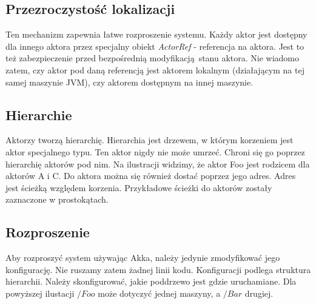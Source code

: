 \documentclass[oneside, 12pt, a4paper]{article}
\begin{document}
\begin{multicols}{2}
\subsection{Przezroczystość lokalizacji}
Ten mechanizm zapewnia łatwe rozproszenie systemu. Każdy aktor jest dostępny dla innego aktora przez specjalny obiekt \emph{ActorRef} - referencja na aktora. Jest to też zabezpieczenie przed bezpośrednią modyfikacją stanu aktora. Nie wiadomo zatem, czy aktor pod daną referencją jest aktorem lokalnym (działającym na tej samej maszynie JVM), czy aktorem dostępnym na innej maszynie.

\subsection{Hierarchie}
Aktorzy tworzą hierarchię. Hierarchia jest drzewem, w którym korzeniem jest aktor specjalnego typu. Ten aktor nigdy nie może umrzeć. Chroni się go poprzez hierarchię aktorów pod nim. Na ilustracji widzimy, że aktor Foo jest rodzicem dla aktorów A i C. Do aktora można się również dostać poprzez jego adres. Adres jest ścieżką względem korzenia. Przykładowe ścieżki do aktorów zostały zaznaczone w prostokątach.


 \begin{figure}[H]
\end{figure}

\subsection{Rozproszenie}
Aby rozproszyć system używając \mbox{Akka}, należy jedynie zmodyfikować jego konfigurację. Nie ruszamy zatem żadnej linii kodu. Konfiguracji podlega struktura hierarchii. Należy skonfigurować, jakie poddrzewo jest gdzie uruchamiane. Dla powyższej ilustacji $/Foo$ może dotyczyć jednej maszyny, a $/Bar$ drugiej. 


\end{multicols}
\end{document}
